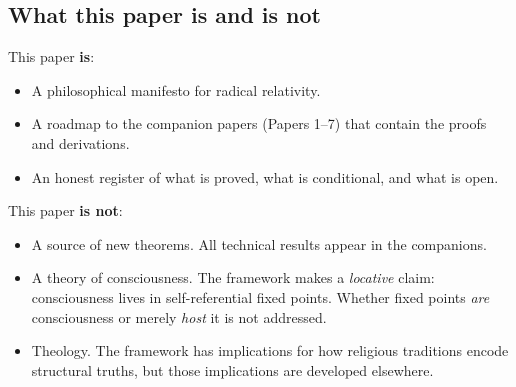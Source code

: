 \subsection{What this paper is and is not}
\label{subsec:scope}

This paper \textbf{is}:
\begin{itemize}[nosep]
  \item A philosophical manifesto for radical relativity.
  \item A roadmap to the companion papers (Papers 1--7) that contain
    the proofs and derivations.
  \item An honest register of what is proved, what is conditional,
    and what is open.
\end{itemize}

\noindent This paper \textbf{is not}:
\begin{itemize}[nosep]
  \item A source of new theorems.  All technical results appear in
    the companions.
  \item A theory of consciousness.  The framework makes a
    \emph{locative} claim: consciousness lives in self-referential
    fixed points.  Whether fixed points \emph{are} consciousness or
    merely \emph{host} it is not addressed.
  \item Theology.  The framework has implications for how religious
    traditions encode structural truths, but those implications are
    developed elsewhere.
\end{itemize}
